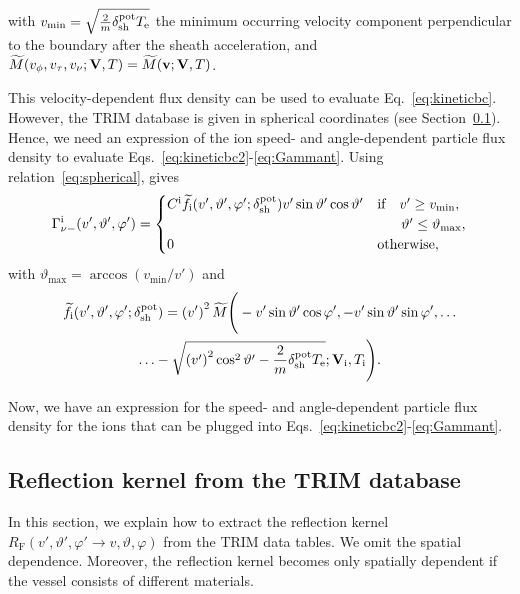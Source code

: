 with $v_{\mathrm{min}} = \sqrt{\frac{2}{m}\delta_{\mathrm{sh}}^{\mathrm{pot}} T_{\mathrm{e}}}$ the minimum occurring velocity component perpendicular to the boundary after the sheath acceleration, and $\widetilde{M}(v_{\phi},v_{\tau},v_{\nu};{\bf V},T) = \widetilde{M}({\bf v};{\bf V},T)$.

This velocity-dependent flux density can be used to evaluate Eq.~\eqref{eq:kineticbc}. However, the TRIM database is given in spherical coordinates (see Section~\ref{sec:TRIM}). Hence, we need an expression of the ion speed- and angle-dependent particle flux density to evaluate Eqs.~\eqref{eq:kineticbc2}-\eqref{eq:Gammant}. Using relation~\eqref{eq:spherical}, gives
\begin{equation}
\Gamma_{\nu -}^{\mathrm{i}}(v',\vartheta',\varphi') = \begin{cases} C^{\mathrm{i}} \widetilde{f}_{\mathrm{i}}(v',\vartheta',\varphi';\delta_{\mathrm{sh}}^{\mathrm{pot}}) v' \sin \vartheta' \cos \vartheta' & \text{if} \quad v' \geq v_{\mathrm{min}}, \\
& \hspace{0.6cm} \vartheta' \leq \vartheta_{\mathrm{max}}, \\
0 & \text{otherwise}, \end{cases} \label{eq:fib}
\end{equation}
with $\vartheta_{\mathrm{max}} = \arccos (v_{\mathrm{min}}/v')$ and
\begin{multline}
\widetilde{f}_{\mathrm{i}}(v',\vartheta',\varphi';\delta_{\mathrm{sh}}^{\mathrm{pot}}) = \left (v' \right )^{2} \widetilde{M} \Bigg (-v' \sin \vartheta' \cos \varphi',-v' \sin \vartheta' \sin \varphi', \ldots \\
\ldots -\sqrt{\left (v'\right )^{2} \cos^{2} \vartheta' -\frac{2}{m} \delta_{\mathrm{sh}}^{\mathrm{pot}} T_{\mathrm{e}}};{\bf V}_{\mathrm{i}},T_{\mathrm{i}} \Bigg ). \label{eq:finormdshpot}
\end{multline}

Now, we have an expression for the speed- and angle-dependent particle flux density for the ions that can be plugged into Eqs.~\eqref{eq:kineticbc2}-\eqref{eq:Gammant}.

\subsection{Reflection kernel from the TRIM database} \label{sec:TRIM}

In this section, we explain how to extract the reflection kernel $R_{\mathrm{F}}(v',\vartheta',\varphi' \rightarrow v,\vartheta,\varphi)$ from the TRIM data tables. We omit the spatial dependence. Moreover, the reflection kernel becomes only spatially dependent if the vessel consists of different materials.

